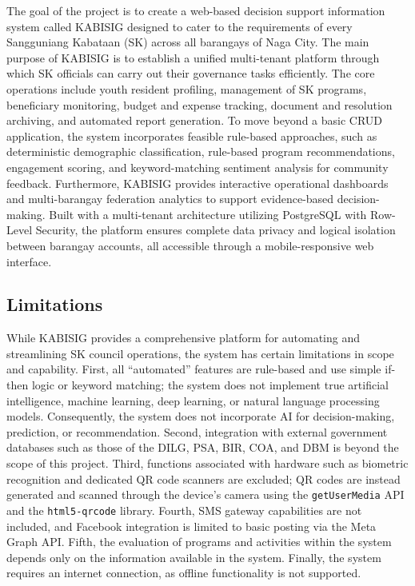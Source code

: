 \hspace*{\parindent}The goal of the project is to create a web-based decision support information system called KABISIG designed to cater to the requirements of every Sangguniang Kabataan (SK) across all barangays of Naga City. The main purpose of KABISIG is to establish a unified multi-tenant platform through which SK officials can carry out their governance tasks efficiently. The core operations include youth resident profiling, management of SK programs, beneficiary monitoring, budget and expense tracking, document and resolution archiving, and automated report generation. To move beyond a basic CRUD application, the system incorporates feasible rule-based approaches, such as deterministic demographic classification, rule-based program recommendations, engagement scoring, and keyword-matching sentiment analysis for community feedback. Furthermore, KABISIG provides interactive operational dashboards and multi-barangay federation analytics to support evidence-based decision-making. Built with a multi-tenant architecture utilizing PostgreSQL with Row-Level Security, the platform ensures complete data privacy and logical isolation between barangay accounts, all accessible through a mobile-responsive web interface.
\vspace{3mm}

\subsection{Limitations}
\label{subsec:limitations}

\hspace*{\parindent}While KABISIG provides a comprehensive platform for automating and streamlining SK council operations, the system has certain limitations in scope and capability. First, all ``automated'' features are rule-based and use simple if-then logic or keyword matching; the system does not implement true artificial intelligence, machine learning, deep learning, or natural language processing models. Consequently, the system does not incorporate AI for decision-making, prediction, or recommendation. Second, integration with external government databases such as those of the DILG, PSA, BIR, COA, and DBM is beyond the scope of this project. Third, functions associated with hardware such as biometric recognition and dedicated QR code scanners are excluded; QR codes are instead generated and scanned through the device's camera using the \texttt{getUserMedia} API and the \texttt{html5-qrcode} library. Fourth, SMS gateway capabilities are not included, and Facebook integration is limited to basic posting via the Meta Graph API. Fifth, the evaluation of programs and activities within the system depends only on the information available in the system. Finally, the system requires an internet connection, as offline functionality is not supported.
\vspace{5mm}

